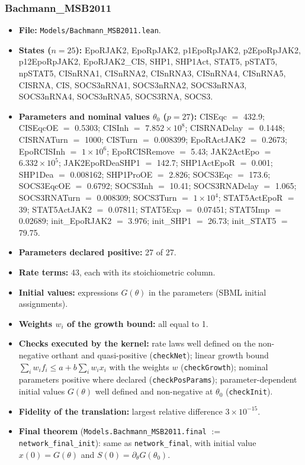 \subsubsection*{Bachmann\_MSB2011}

\begin{itemize}\itemsep0pt\small
\item \textbf{File:} \texttt{Models/Bachmann\_MSB2011.lean}.
\item \textbf{States ($n=25$):} EpoRJAK2, EpoRpJAK2, p1EpoRpJAK2, p2EpoRpJAK2, p12EpoRpJAK2, EpoRJAK2\_CIS, SHP1, SHP1Act, STAT5, pSTAT5, npSTAT5, CISnRNA1, CISnRNA2, CISnRNA3, CISnRNA4, CISnRNA5, CISRNA, CIS, SOCS3nRNA1, SOCS3nRNA2, SOCS3nRNA3, SOCS3nRNA4, SOCS3nRNA5, SOCS3RNA, SOCS3.
\item \textbf{Parameters and nominal values $\theta_0$ ($p=27$):} CISEqc $=$ 432.9; CISEqcOE $=$ 0.5303; CISInh $=$ $7.852\times10^{8}$; CISRNADelay $=$ 0.1448; CISRNATurn $=$ 1000; CISTurn $=$ 0.008399; EpoRActJAK2 $=$ 0.2673; EpoRCISInh $=$ $1\times10^{6}$; EpoRCISRemove $=$ 5.43; JAK2ActEpo $=$ $6.332\times10^{5}$; JAK2EpoRDeaSHP1 $=$ 142.7; SHP1ActEpoR $=$ 0.001; SHP1Dea $=$ 0.008162; SHP1ProOE $=$ 2.826; SOCS3Eqc $=$ 173.6; SOCS3EqcOE $=$ 0.6792; SOCS3Inh $=$ 10.41; SOCS3RNADelay $=$ 1.065; SOCS3RNATurn $=$ 0.008309; SOCS3Turn $=$ $1\times10^{4}$; STAT5ActEpoR $=$ 39; STAT5ActJAK2 $=$ 0.07811; STAT5Exp $=$ 0.07451; STAT5Imp $=$ 0.02689; init\_EpoRJAK2 $=$ 3.976; init\_SHP1 $=$ 26.73; init\_STAT5 $=$ 79.75.
\item \textbf{Parameters declared positive:} 27 of 27.
\item \textbf{Rate terms:} 43, each with its stoichiometric column.
\item \textbf{Initial values:} expressions $G(\theta)$ in the parameters (SBML initial assignments).
\item \textbf{Weights $w_i$ of the growth bound:} all equal to 1.
\item \textbf{Checks executed by the kernel:} rate laws well defined on the non-negative orthant and quasi-positive (\texttt{checkNet}); linear growth bound $\sum_iw_if_i\le a+b\sum_iw_ix_i$ with the weights $w$ (\texttt{checkGrowth}); nominal parameters positive where declared (\texttt{checkPosParams}); parameter-dependent initial values $G(\theta)$ well defined and non-negative at $\theta_0$ (\texttt{checkInit}).
\item \textbf{Fidelity of the translation:} largest relative difference $3\times10^{-15}$.
\item \textbf{Final theorem} (\texttt{Models.Bachmann\_MSB2011.final} $:=$ \texttt{network\_final\_init}): same as \texttt{network\_final}, with initial value $x(0)=G(\theta)$ and $S(0)=\partial_\theta G(\theta_0)$.
\end{itemize}

